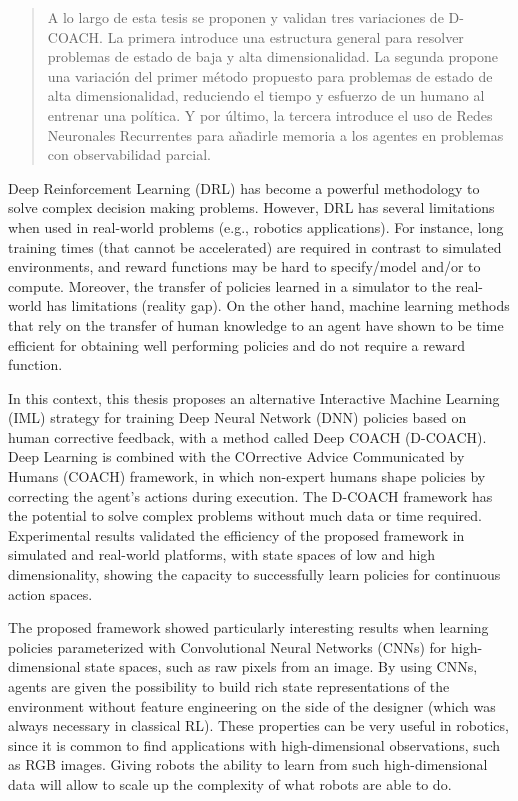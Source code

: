 \documentclass[upright, contnum]{umemoria}
\begin{document}
\begin{abstract}
A lo largo de esta tesis se proponen y validan tres variaciones de D-COACH. La primera introduce una estructura general para resolver problemas de estado de baja y alta dimensionalidad. La segunda propone una variación del primer método propuesto para problemas de estado de alta dimensionalidad, reduciendo el tiempo y esfuerzo de un humano al entrenar una política. Y por último, la tercera introduce el uso de Redes Neuronales Recurrentes para añadirle memoria a los agentes en problemas con observabilidad parcial.

\end{abstract}

\begin{abstract_eng}
Deep Reinforcement Learning (DRL) has become a powerful methodology to solve complex decision making problems. However, DRL has several limitations when used in real-world problems (e.g., robotics applications). For instance, long training times (that cannot be accelerated) are required in contrast to simulated environments, and reward functions may be hard to specify/model and/or to compute. Moreover, the transfer of policies learned in a simulator to the real-world has limitations (reality gap). On the other hand, machine learning methods that rely on the transfer of human knowledge to an agent have shown to be time efficient for obtaining well performing policies and do not require a reward function.

In this context, this thesis proposes an alternative Interactive Machine Learning (IML) strategy for training Deep Neural Network (DNN) policies based on human corrective feedback, with a method called Deep COACH (D-COACH). Deep Learning is combined with the COrrective Advice Communicated by Humans (COACH) framework, in which non-expert humans shape policies by correcting the agent’s actions during execution. The D-COACH framework has the potential to solve complex problems without much data or time required. Experimental results validated the efficiency of the proposed framework in simulated and real-world platforms, with state spaces of low and high dimensionality, showing the capacity to successfully learn policies for continuous action spaces. 

The proposed framework showed particularly interesting results when learning policies parameterized with Convolutional Neural Networks (CNNs) for high-dimensional state spaces, such as raw pixels from an image. By using CNNs, agents are given the possibility to build rich state representations of the environment without feature engineering on the side of the designer (which was always necessary in classical RL). These properties can be very useful in robotics, since it is common to find applications with high-dimensional observations, such as RGB images. Giving robots the ability to learn from such high-dimensional data will allow to scale up the complexity of what robots are able to do.


\end{abstract_eng}
\end{document}
